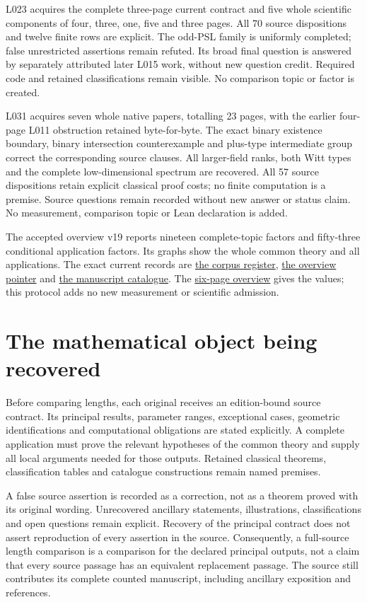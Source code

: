 \documentclass[11pt,a4paper]{article}
\begin{document}
L023 acquires the complete three-page current contract and five whole
scientific components of four, three, one, five and three pages. All 70
source dispositions and twelve finite rows are explicit. The odd-PSL family
is uniformly completed; false unrestricted assertions remain refuted.
Its broad final question is answered by separately attributed later L015
work, without new question credit. Required code and retained classifications
remain visible. No comparison topic or factor is created.

L031 acquires seven whole native papers, totalling 23 pages, with the earlier
four-page L011 obstruction retained byte-for-byte. The exact binary existence
boundary, binary intersection counterexample and plus-type intermediate group
correct the corresponding source clauses. All larger-field ranks, both Witt
types and the complete low-dimensional spectrum are recovered. All 57 source
dispositions retain explicit classical proof costs; no finite computation is
a premise. Source questions remain recorded without new answer or status claim.
No measurement, comparison topic or Lean declaration is added.

The accepted overview v19 reports nineteen complete-topic factors and fifty-three
conditional application factors. Its graphs show the whole common theory and
all applications. The exact current records are
\href{corpus/latest.json}{the corpus register},
\href{overview/latest.json}{the overview pointer} and
\href{../papers/latest_catalogue.json}{the manuscript catalogue}.
The \href{overview/v19/packet/reader.pdf}{six-page overview} gives the values;
this protocol adds no new measurement or scientific admission.

\section{The mathematical object being recovered}

Before comparing lengths, each original receives an edition-bound source
contract. Its principal results, parameter ranges, exceptional cases, geometric
identifications and computational obligations are stated explicitly. A complete
application must prove the relevant hypotheses of the common theory and supply
all local arguments needed for those outputs. Retained classical theorems,
classification tables and catalogue constructions remain named premises.

A false source assertion is recorded as a correction, not as a theorem proved
with its original wording. Unrecovered ancillary statements, illustrations,
classifications and open questions remain explicit. Recovery of the principal
contract does not assert reproduction of every assertion in the source.
Consequently, a full-source length comparison is a comparison for the declared
principal outputs, not a claim that every source passage has an equivalent
replacement passage. The source still contributes its complete counted
manuscript, including ancillary exposition and references.
\end{document}
